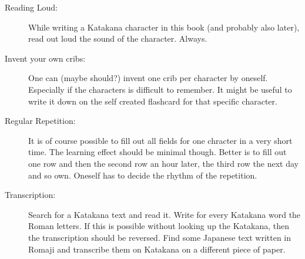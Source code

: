 \begin{description}

\item[Reading Loud:] While writing a Katakana character in this book (and
probably also later), read out loud the sound of the character. Always. 

\item[Invent your own cribs:] One can (maybe should?) invent one crib per
character by oneself. Especially if the characters is difficult to remember. It
might be useful to write it down on the self created flashcard for that
specific character.

\item[Regular Repetition:] It is of course possible to fill out all fields
for one chracter in a very short time. The learning effect should be minimal
though. Better is to fill out one row and then the second row an hour later,
the third row the next day and so own. Oneself has to decide the rhythm of
the repetition. 

\item[Transcription:]  Search for a  Katakana text and read it. Write for every
Katakana word the Roman letters. If this is possible without looking up the
Katakana, then the transcription should be reversed. Find some Japanese text
written in Romaji and transcribe them on Katakana on a different piece of
paper. 

\end{description}

\newpage








